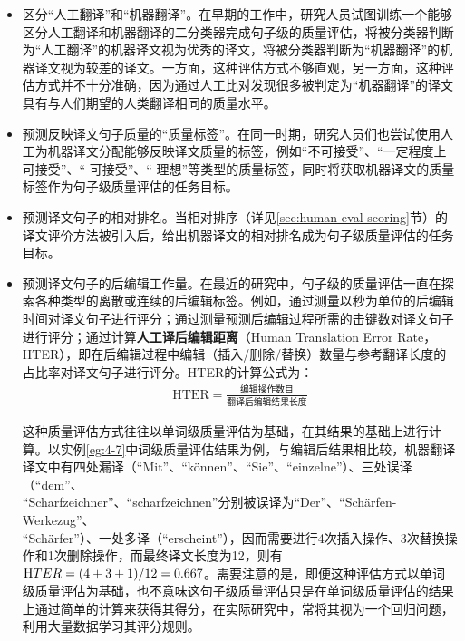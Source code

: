 \begin{itemize}
\vspace{0.5em}
\item 区分“人工翻译”和“机器翻译”。在早期的工作中，研究人员试图训练一个能够区分人工翻译和机器翻译的二分类器完成句子级的质量评估，将被分类器判断为“人工翻译”的机器译文视为优秀的译文，将被分类器判断为“机器翻译”的机器译文视为较差的译文。一方面，这种评估方式不够直观，另一方面，这种评估方式并不十分准确，因为通过人工比对发现很多被判定为“机器翻译”的译文具有与人们期望的人类翻译相同的质量水平。
\vspace{0.5em}
\item 预测反映译文句子质量的“质量标签”。在同一时期，研究人员们也尝试使用人工为机器译文分配能够反映译文质量的标签，例如“不可接受”、“一定程度上可接受”、“ 可接受”、“ 理想”等类型的质量标签，同时将获取机器译文的质量标签作为句子级质量评估的任务目标。
\vspace{0.5em}
\item 预测译文句子的相对排名。当相对排序（详见\ref{sec:human-eval-scoring}节）的译文评价方法被引入后，给出机器译文的相对排名成为句子级质量评估的任务目标。
\vspace{0.5em}
\item 预测译文句子的后编辑工作量。在最近的研究中，句子级的质量评估一直在探索各种类型的离散或连续的后编辑标签。例如，通过测量以秒为单位的后编辑时间对译文句子进行评分；通过测量预测后编辑过程所需的击键数对译文句子进行评分；通过计算{\small\sffamily\bfseries{人工译后编辑距离}}（Human Translation Error Rate，HTER），即在后编辑过程中编辑（插入/删除/替换）数量与参考翻译长度的占比率对译文句子进行评分。HTER的计算公式为：
\vspace{0.5em}
\begin{eqnarray}
\textrm{HTER}= \frac{\mbox{编辑操作数目}}{\mbox{翻译后编辑结果长度}}
\label{eq:4-20}
\end{eqnarray}

\parinterval 这种质量评估方式往往以单词级质量评估为基础，在其结果的基础上进行计算。以实例\ref{eg:4-7}中词级质量评估结果为例，与编辑后结果相比较，机器翻译译文中有四处漏译（“Mit”、“können”、“Sie”、“einzelne”）、三处误译（“dem”、\\“Scharfzeichner”、“scharfzeichnen”分别被误译为“Der”、“Schärfen-Werkezug”、\\“Schärfer”）、一处多译（“erscheint”），因而需要进行4次插入操作、3次替换操作和1次删除操作，而最终译文长度为12，则有$\textrm HTER=(4+3+1)/12=0.667$。需要注意的是，即便这种评估方式以单词级质量评估为基础，也不意味这句子级质量评估只是在单词级质量评估的结果上通过简单的计算来获得其得分，在实际研究中，常将其视为一个回归问题，利用大量数据学习其评分规则。
\vspace{0.5em}
\end{itemize}

